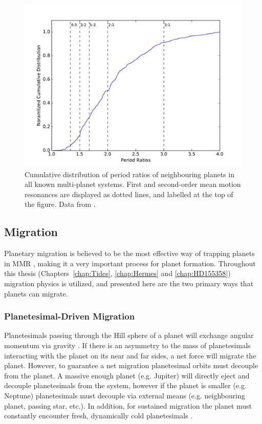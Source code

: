 \begin{figure}
\centering
\includegraphics[width=1.00\textwidth]{intro/PeriodRatios}
\caption{
Cumulative distribution of period ratios of neighbouring planets in all known multi-planet systems.
 First and second-order mean motion resonances are displayed as dotted lines, and labelled at the top of the figure. 
 Data from \citet{Akeson2013}.}
\label{fig:KepMMR}
\end{figure}

\subsection{Migration}
\label{sec:migration}
Planetary migration is believed to be the most effective way of trapping planets in MMR \citep[e.g.][]{Lee2002}, making it a very important process for planet formation.  
Throughout this thesis (Chapters~\ref{chap:Tides}, \ref{chap:Hermes} and \ref{chap:HD155358}) migration physics is utilized, and presented here are the two primary ways that planets can migrate.

\subsubsection{Planetesimal-Driven Migration}
Planetesimals passing through the Hill sphere of a planet will exchange angular momentum via gravity \citep{Ida2000, Kirsh2009}.
If there is an asymmetry to the mass of planetesimals interacting with the planet on its near and far sides, a net force will migrate the planet. 
However, to guarantee a net migration planetesimal orbits must decouple from the planet. 
A massive enough planet (e.g. Jupiter) will directly eject and decouple planetesimals from the system, however if the planet is smaller (e.g. Neptune) planetesimals must decouple via external means (e.g. neighbouring planet, passing star, etc.). 
In addition, for sustained migration the planet must constantly encounter fresh, dynamically cold planetesimals \citep{Gomes2004}.  

